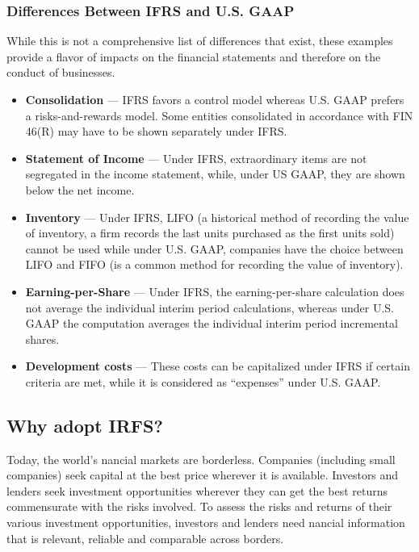 \subsubsection {Differences Between IFRS and U.S. GAAP}
While this is not a comprehensive list of differences that exist, these examples provide a flavor of impacts on the financial statements and therefore on the conduct of businesses.
\begin{itemize}
	\item \textbf{Consolidation} — IFRS favors a control model whereas U.S. GAAP prefers a risks-and-rewards model. Some entities consolidated in accordance with FIN 46(R) may have to be shown separately under IFRS.
	\item \textbf{Statement of Income} — Under IFRS, extraordinary items are not segregated in the income statement, while, under US GAAP, they are shown below the net income.
	\item \textbf{Inventory} — Under IFRS, LIFO (a historical method of recording the value of inventory, a firm records the last units purchased as the first units sold) cannot be used while under U.S. GAAP, companies have the choice between LIFO and FIFO (is a common method for recording the value of inventory).
	\item \textbf{Earning-per-Share} — Under IFRS, the earning-per-share calculation does not average the individual interim period calculations, whereas under U.S. GAAP the computation averages the individual interim period incremental shares.
	\item \textbf{Development costs} — These costs can be capitalized under IFRS if certain criteria are met, while it is considered as “expenses” under U.S. GAAP.
\end{itemize}


\subsection{Why adopt IRFS?}
Today, the world’s  nancial markets are borderless. Companies (including small companies) seek capital at the best price wherever it is available. Investors and lenders seek investment opportunities wherever they can get the best returns commensurate with the risks involved. To assess the risks and returns of their various investment opportunities, investors and lenders need  nancial information that is relevant, reliable and comparable across borders. \\

